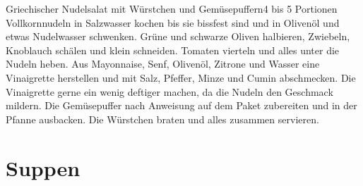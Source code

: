\documentclass[a4paper,10pt]{article}
\begin{document}
    \begin{recipe}{Griechischer Nudelsalat mit Würstchen und Gemüsepuffern}{4 bis 5 Portionen}{}
        Vollkornnudeln in Salzwasser kochen bis sie bissfest sind und in Olivenöl und etwas Nudelwasser schwenken.
        Grüne und schwarze Oliven halbieren, Zwiebeln, Knoblauch schälen und klein schneiden. 
        Tomaten vierteln und alles unter die Nudeln heben.
        Aus Mayonnaise, Senf, Olivenöl, Zitrone und Wasser eine Vinaigrette herstellen und mit Salz,
        Pfeffer, Minze und Cumin abschmecken. Die Vinaigrette gerne ein wenig deftiger machen,
        da die Nudeln den Geschmack mildern.
        Die Gemüsepuffer nach Anweisung auf dem Paket zubereiten und in der Pfanne ausbacken.
        Die Würstchen braten und alles zusammen servieren.
        
        \freeform \hfill 
        
    \end{recipe}

    \newpage
    
    
    \section{Suppen}
    
\end{document}
